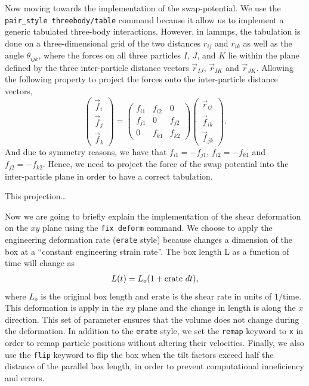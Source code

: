 Now moving towards the implementation of the swap-potential.
We use the \verb|pair_style threebody/table| command because it allow us to implement a generic tabulated three-body interactions.
However, in lammps, the tabulation is done on a three-dimensional grid of the two distances $r_{ij}$ and $r_{ik}$ as well as the angle $\theta_{ijk}$, where the forces on all three particles $I$, $J$, and $K$ lie within the plane defined by the three inter-particle distance vectors $\vec{r}_{IJ}$, $\vec{r}_{IK}$ and $\vec{r}_{JK}$\citep{LAMMPS}.
Allowing the following property to project the forces onto the inter-particle distance vectors,
\begin{equation}
    \begin{pmatrix}\vec{f}_i \\ \vec{f}_j \\ \vec{f}_k\end{pmatrix}
    =
    \begin{pmatrix}f_{i1} & f_{i2} & 0 \\ f_{j1} & 0 & f_{j2} \\ 0 & f_{k1} & f_{k2} \end{pmatrix}
    \begin{pmatrix}\vec{r}_{ij} \\ \vec{f}_{ik} \\ \vec{f}_{jk}\end{pmatrix}.
\end{equation}
And due to symmetry reasons, we have that $f_{i1}=-f_{j1}$, $f_{i2}=-f_{k1}$ and $f_{j2}=-f_{k2}$.
Hence, we need to project the force of the swap potential into the inter-particle plane in order to have a correct tabulation.

This projection\ldots

Now we are going to briefly explain the implementation of the shear deformation on the $xy$ plane using the \verb|fix deform| command.
We choose to apply the engineering deformation rate (\verb|erate| style) because changes a dimension of the box at a “constant engineering strain rate”.
The box length L as a function of time will change as
\begin{gather}
    L(t) = L_o\qty(1 + \mathrm{erate}~dt),
\end{gather}
where $L_o$ is the original box length and $\mathrm{erate}$ is the shear rate in units of $1/\mathrm{time}$\citep{LAMMPS}.
This deformation is apply in the $xy$ plane and the change in length is along the $x$ direction.
This set of parameter ensures that the volume does not change during the deformation\citep{LAMMPS}.
In addition to the \verb|erate| style, we set the \verb|remap| keyword to \verb|x| in order to remap particle positions without altering their velocities\citep{LAMMPS}.
Finally, we also use the \verb|flip| keyword to flip the box when the tilt factors exceed half the distance of the parallel box length, in order to prevent computational inneficiency and errors\citep{LAMMPS}.

